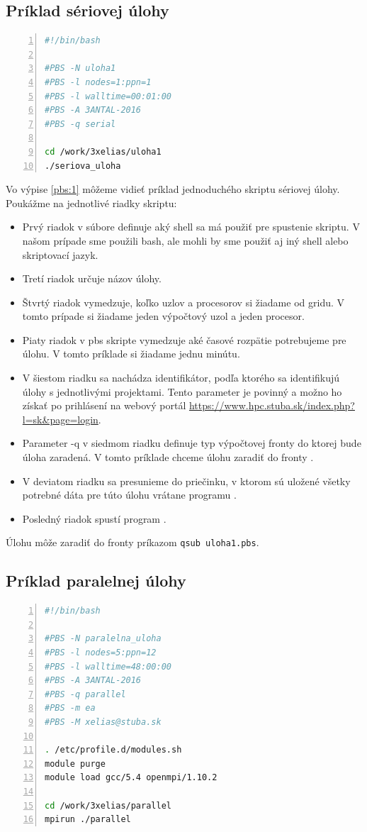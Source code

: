 \subsection{Príklad sériovej úlohy}

\begin{lstlisting}[language=bash, caption={uloha1.pbs}, label={pbs:1}, numbers=left]
#!/bin/bash

#PBS -N uloha1
#PBS -l nodes=1:ppn=1
#PBS -l walltime=00:01:00  
#PBS -A 3ANTAL-2016
#PBS -q serial

cd /work/3xelias/uloha1
./seriova_uloha
\end{lstlisting}

Vo výpise \ref{pbs:1} môžeme vidieť príklad jednoduchého skriptu sériovej úlohy.
Poukážme na jednotlivé riadky skriptu:
\begin{itemize}
\item
  Prvý riadok v súbore definuje aký shell sa má použiť pre spustenie skriptu.
  V našom prípade sme použili \acrshort{bash}, ale mohli by sme použiť aj iný shell alebo skriptovací jazyk.
\item
  Tretí riadok určuje názov úlohy.
\item
  Štvrtý riadok vymedzuje, koľko uzlov a procesorov si žiadame od gridu.
  V tomto prípade si žiadame jeden výpočtový uzol a jeden procesor.
\item
  Piaty riadok v \acrshort{pbs} skripte vymedzuje aké časové rozpätie potrebujeme pre úlohu.
  V tomto príklade si žiadame jednu minútu.
\item
  V šiestom riadku sa nachádza identifikátor, podľa ktorého sa identifikujú úlohy s jednotlivými projektami.
  Tento parameter je povinný a možno ho získať po prihlásení na webový portál \url{https://www.hpc.stuba.sk/index.php?l=sk&page=login}.
\item
  Parameter -q v siedmom riadku definuje typ výpočtovej fronty do ktorej bude úloha zaradená.
  V tomto príklade chceme úlohu zaradiť do fronty .
\item
  V deviatom riadku sa presunieme do priečinku, v ktorom sú uložené všetky potrebné dáta pre túto úlohu vrátane programu .
\item
  Posledný riadok spustí program .
\end{itemize}
Úlohu môže zaradiť do fronty príkazom \texttt{qsub uloha1.pbs}.

\subsection{Príklad paralelnej úlohy}
\begin{lstlisting}[language=bash, caption={uloha2.pbs}, label={pbs:2}, numbers=left]
#!/bin/bash

#PBS -N paralelna_uloha
#PBS -l nodes=5:ppn=12
#PBS -l walltime=48:00:00  
#PBS -A 3ANTAL-2016
#PBS -q parallel
#PBS -m ea
#PBS -M xelias@stuba.sk

. /etc/profile.d/modules.sh
module purge
module load gcc/5.4 openmpi/1.10.2

cd /work/3xelias/parallel
mpirun ./parallel
\end{lstlisting}

